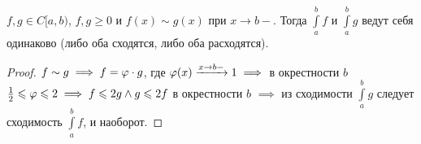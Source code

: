 \begin{consequence}
    $f, g \in C[a, b)$,  $f, g \ge 0$ и $f(x) \sim g(x)$ при $x \to b-$. Тогда  $\int\limits_a^b f$ и  $\int\limits_a^b g$ ведут себя одинаково (либо оба сходятся, либо оба расходятся).
\end{consequence}
\begin{proof}
    $f \sim g \implies f = \varphi \cdot g$, где  $\varphi(x) \xrightarrow{x \to b-} 1 \implies$ в окрестности $b$  $\frac{1}{2} \leqslant \varphi \leqslant 2 \implies f \leqslant 2g \land g \leqslant 2f$ в окрестности $b$  $\implies$ из сходимости  $\int\limits_a^b g$ следует сходимость $\int\limits_a^b f$, и наоборот. 
\end{proof}
